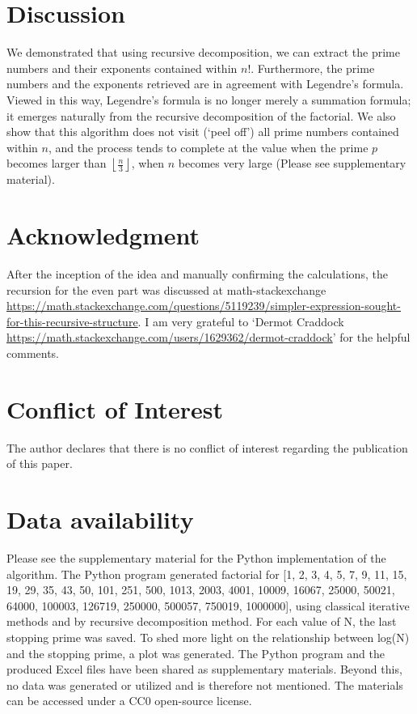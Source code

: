 \documentclass[10 pt,a4paper, article]{amsart}
\newcommand{\floor}[1]{\left\lfloor #1 \right\rfloor}
\begin{document}
\section{Discussion}\label{sec:discussion}
We demonstrated that using recursive decomposition, we can extract the prime numbers and their exponents contained within $n!$. Furthermore, the prime numbers and the exponents retrieved are in agreement with  Legendre's formula. Viewed in this way, Legendre's formula is no longer merely a summation formula; it emerges naturally from the recursive decomposition of the factorial. We also show that this algorithm does not visit (`peel off') all prime numbers contained within $n$, and the process tends to complete at the value when the prime $p$ becomes larger than $\floor{\frac{n}{3}}$, when $n$ becomes very large (Please see supplementary material).

\section{Acknowledgment}
After the inception of the idea and manually confirming the calculations, the recursion for the even part was discussed at math-stackexchange \url{https://math.stackexchange.com/questions/5119239/simpler-expression-sought-for-this-recursive-structure}. I am very grateful to `Dermot Craddock \url{https://math.stackexchange.com/users/1629362/dermot-craddock}' for the helpful comments.

\section{Conflict of Interest}

The author declares that there is no conflict of interest regarding the publication of this paper.

\section{Data availability}
		
Please see the supplementary material for the Python implementation of the algorithm. The Python program generated factorial for [1, 2, 3, 4, 5, 7, 9, 11, 15, 19, 29, 35, 43, 50,  101, 251, 500, 1013, 2003, 4001, 10009, 16067, 25000, 50021, 64000, 100003, 126719, 250000, 500057, 750019, 1000000], using classical iterative methods and by recursive decomposition method. For each value of N, the last stopping prime was saved. To shed more light on the relationship between log(N) and the stopping prime, a plot was generated. The Python program and the produced Excel files have been shared as supplementary materials. Beyond this, no data was generated or utilized and is therefore not mentioned. The materials can be accessed under a CC0 open-source license.
\end{document}
